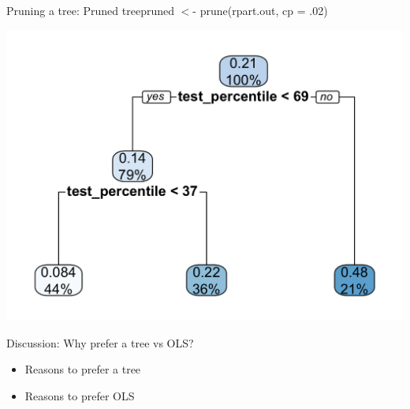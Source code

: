 \documentclass{beamer}
\begin{document}
\begin{frame}{Pruning a tree: Pruned tree}{pruned $<$- prune(rpart.out, cp = .02)}

\includegraphics[width = \textwidth]{figures/tree_fitting_figure_pruned}

\end{frame}

\begin{frame}{Discussion: Why prefer a tree vs OLS?}

\begin{itemize}
\item Reasons to prefer a tree
\item Reasons to prefer OLS
\end{itemize}

\end{frame}
\end{document}

